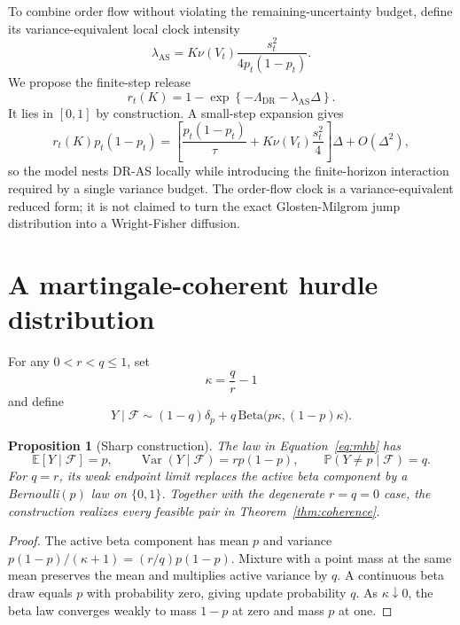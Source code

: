 \documentclass[11pt]{article}
\newtheorem{proposition}{Proposition}
\newcommand{\E}{\mathbb E}
\newcommand{\Pp}{\mathbb P}
\newcommand{\Var}{\operatorname{Var}}
\newcommand{\1}{\mathbb I}
\newcommand{\F}{\mathcal F}
\begin{document}
To combine order flow without violating the remaining-uncertainty budget,
define its variance-equivalent local clock intensity
\begin{equation}
\lambda_{\mathrm{AS}}
=K\nu(V_t)\frac{s_t^2}{4p_t(1-p_t)}.
\end{equation}
We propose the finite-step release
\begin{equation}
r_t(K)
=1-\exp\left\{-\Lambda_{\mathrm{DR}}
-\lambda_{\mathrm{AS}}\Delta\right\}.
\label{eq:release}
\end{equation}
It lies in $[0,1]$ by construction. A small-step expansion gives
\begin{equation}
r_t(K)p_t(1-p_t)
=\left[\frac{p_t(1-p_t)}{\tau}
+K\nu(V_t)\frac{s_t^2}{4}\right]\Delta+O(\Delta^2),
\end{equation}
so the model nests DR-AS locally while introducing the finite-horizon
interaction required by a single variance budget. The order-flow clock is a
variance-equivalent reduced form; it is not claimed to turn the exact
Glosten-Milgrom jump distribution into a Wright-Fisher diffusion.

\section{A martingale-coherent hurdle distribution}

For any $0<r<q\le1$, set
\begin{equation}
\kappa=\frac{q}{r}-1
\end{equation}
and define
\begin{equation}
Y\mid\F\sim(1-q)\delta_p
+q\,\mathrm{Beta}\bigl(p\kappa,(1-p)\kappa\bigr).
\label{eq:mhb}
\end{equation}

\begin{proposition}[Sharp construction]
The law in Equation~\eqref{eq:mhb} has
\begin{equation}
\E[Y\mid\F]=p,\qquad
\Var(Y\mid\F)=r p(1-p),\qquad
\Pp(Y\ne p\mid\F)=q.
\end{equation}
For $q=r$, its weak endpoint limit replaces the active beta component by a
Bernoulli$(p)$ law on $\{0,1\}$. Together with the degenerate $r=q=0$ case, the
construction realizes every feasible pair in Theorem~\ref{thm:coherence}.
\end{proposition}

\begin{proof}
The active beta component has mean $p$ and variance
$p(1-p)/(\kappa+1)=(r/q)p(1-p)$. Mixture with a point mass at the same mean
preserves the mean and multiplies active variance by $q$. A continuous beta draw
equals $p$ with probability zero, giving update probability $q$. As
$\kappa\downarrow0$, the beta law converges weakly to mass $1-p$ at zero and
mass $p$ at one.
\end{proof}
\end{document}
